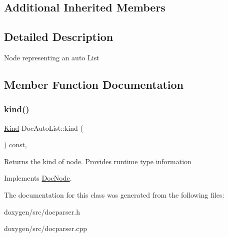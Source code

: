 \subsection*{Additional Inherited Members}


\subsection{Detailed Description}
Node representing an auto List 

\subsection{Member Function Documentation}
\mbox{\label{class_doc_auto_list_af7e24f8b1cfb9b2c6ee150e0d3da70ac}} 
\subsubsection{\texorpdfstring{kind()}{kind()}}
{\footnotesize\ttfamily \mbox{\hyperlink{class_doc_node_aebd16e89ca590d84cbd40543ea5faadb}{Kind}} Doc\+Auto\+List\+::kind (\begin{DoxyParamCaption}{ }\end{DoxyParamCaption}) const\hspace{0.3cm}{\ttfamily [inline]}, {\ttfamily [virtual]}}

Returns the kind of node. Provides runtime type information 

Implements \mbox{\hyperlink{class_doc_node_a108ffd214a72ba6e93dac084a8f58049}{Doc\+Node}}.



The documentation for this class was generated from the following files\+:\begin{DoxyCompactItemize}
\item 
doxygen/src/docparser.\+h\item 
doxygen/src/docparser.\+cpp\end{DoxyCompactItemize}
